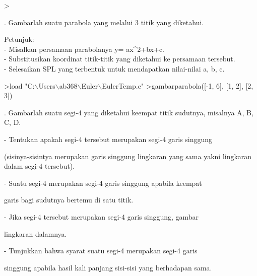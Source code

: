 \documentclass{article}
\newenvironment{eulernotebook}{\par}{\par}
\newenvironment{eulercomment}{\par\medskip}{\par\medskip}
\begin{document}
\begin{eulernotebook}
\begin{eulercomment}
\begin{eulercomment}
\begin{eulercomment}
\begin{eulercomment}
\begin{eulerudf}
\end{eulerudf}
\begin{eulerprompt}
>    
\end{eulerprompt}
\begin{eulercomment}
2. Gambarlah suatu parabola yang melalui 3 titik yang diketahui.

Petunjuk:\\
- Misalkan persamaan parabolanya y= ax\textasciicircum{}2+bx+c.\\
- Substitusikan koordinat titik-titik yang diketahui ke persamaan
tersebut.\\
- Selesaikan SPL yang terbentuk untuk mendapatkan nilai-nilai a, b, c.

\end{eulercomment}
\begin{eulerprompt}
>load "C:\(\backslash\)Users\(\backslash\)ab368\(\backslash\)Euler\(\backslash\)EulerTemp.e"
>gambarparabola([-1, 6], [1, 2], [2, 3])   
\end{eulerprompt}
\begin{eulercomment}
3. Gambarlah suatu segi-4 yang diketahui keempat titik sudutnya,
misalnya A, B, C, D.\\
\end{eulercomment}
\begin{eulerttcomment}
   - Tentukan apakah segi-4 tersebut merupakan segi-4 garis singgung
\end{eulerttcomment}
\begin{eulercomment}
(sisinya-sisintya merupakan garis singgung lingkaran yang sama yakni
lingkaran dalam segi-4 tersebut).\\
\end{eulercomment}
\begin{eulerttcomment}
   - Suatu segi-4 merupakan segi-4 garis singgung apabila keempat
\end{eulerttcomment}
\begin{eulercomment}
garis bagi sudutnya bertemu di satu titik.\\
\end{eulercomment}
\begin{eulerttcomment}
   - Jika segi-4 tersebut merupakan segi-4 garis singgung, gambar
\end{eulerttcomment}
\begin{eulercomment}
lingkaran dalamnya.\\
\end{eulercomment}
\begin{eulerttcomment}
   - Tunjukkan bahwa syarat suatu segi-4 merupakan segi-4 garis
\end{eulerttcomment}
\begin{eulercomment}
singgung apabila hasil kali panjang sisi-sisi yang berhadapan sama.


\end{eulercomment}
\end{eulercomment}
\end{eulercomment}
\end{eulercomment}
\end{eulercomment}
\end{eulernotebook}
\end{document}
